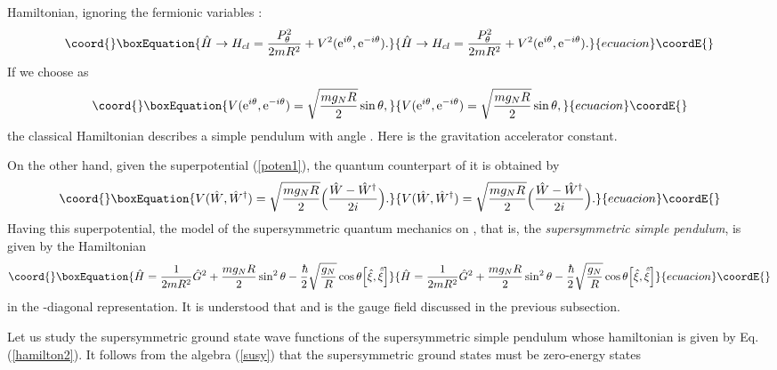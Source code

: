 \documentclass[a4paper,12pt]{article}
\begin{document}
Hamiltonian, ignoring the fermionic variables \myHighlight{$\hxi, \hxib$}\coordHE{}:
\begin{equation}\coord{}\boxEquation{
\hat H\rightarrow H_{cl}={P_{\theta}^2\over {2mR^2}}+
V^2(\e^{i\theta},\e^{-i\theta}).
}{
\hat H\rightarrow H_{cl}={P_{\theta}^2\over {2mR^2}}+
V^2(\e^{i\theta},\e^{-i\theta}).
}{ecuacion}\coordE{}\end{equation}
If we choose \coordHE{} as
\begin{equation}\coord{}\boxEquation{
V(\e^{i\theta},\e^{-i\theta})=\sqrt{{{mg_NR}\over 2}}\sin\theta,
\label{poten1}
}{
V(\e^{i\theta},\e^{-i\theta})=\sqrt{{{mg_NR}\over 2}}\sin\theta,
}{ecuacion}\coordE{}\end{equation}
the classical Hamiltonian describes a simple pendulum with angle 
\myHighlight{$2\theta$}\coordHE{}. Here \coordHE{} is the gravitation accelerator constant.
\par
On the other hand, given the superpotential (\ref{poten1}), the quantum
counterpart of it is obtained by 
\begin{equation}\coord{}\boxEquation{  
V(\hw,\hwd)=\sqrt{{mg_NR}\over {2}}\Bigl({{\hw-\hwd}\over {2i}}\Bigr).
}{  
V(\hw,\hwd)=\sqrt{{mg_NR}\over {2}}\Bigl({{\hw-\hwd}\over {2i}}\Bigr).
}{ecuacion}\coordE{}\end{equation}
Having this superpotential, the model of the supersymmetric quantum
mechanics on \coordHE{}, that is, the {\it supersymmetric simple pendulum}, is 
given by the Hamiltonian
\begin{equation}\coord{}\boxEquation{
\hat H= {1\over {2mR^2}}\hg^2+{{mg_NR}\over 2}\sin^2\theta 
-{\hbar\over 2}\sqrt{{g_N\over R}}\cos\theta\Bigl[\hxi, \hxib\Bigr]
\label{hamilton2} 
}{
\hat H= {1\over {2mR^2}}\hg^2+{{mg_NR}\over 2}\sin^2\theta 
-{\hbar\over 2}\sqrt{{g_N\over R}}\cos\theta\Bigl[\hxi, \hxib\Bigr]
}{ecuacion}\coordE{}\end{equation}
in the \myHighlight{$\hw$}\coordHE{}-diagonal representation. 
It is understood that \coordHE{} and 
\myHighlight{$\alpha$}\coordHE{} is the gauge field discussed in the previous subsection.
\par
Let us study the supersymmetric ground state wave functions of 
the supersymmetric simple pendulum whose hamiltonian 
is given by Eq. (\ref{hamilton2}). 
It follows from the algebra (\ref{susy}) that
the supersymmetric ground states must be zero-energy states 
\end{document}
